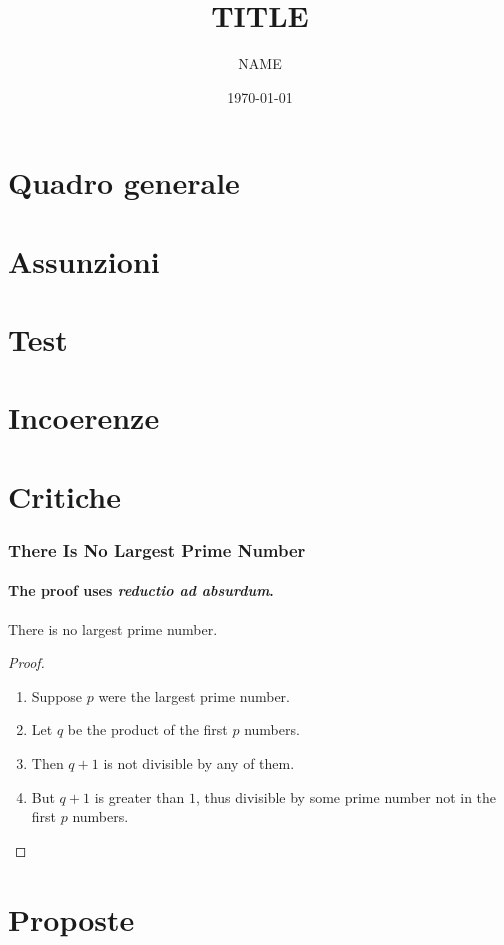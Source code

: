 \documentclass[13pt]{beamer}
\begin{document}
\title[foo]{TITLE}
\author[bar]{NAME}
\date{\today}
\begin{frame}
\maketitle
\end{frame}
\section{Quadro generale}
\section{Assunzioni}
\section{Test}
\section{Incoerenze}
\section{Critiche}
\begin{frame}
\frametitle{There Is No Largest Prime Number}
\framesubtitle{The proof uses \textit{reductio ad absurdum}.}
\begin{theorem}
There is no largest prime number.
\end{theorem}
\begin{proof}
\begin{enumerate}
\item<1-| alert@1> Suppose $p$ were the largest prime number.
\item<2-> Let $q$ be the product of the first $p$ numbers.
\item<3-> Then $q+1$ is not divisible by any of them.
\item<1-> But $q + 1$ is greater than $1$, thus divisible by some prime
number not in the first $p$ numbers.\qedhere
\end{enumerate}
\end{proof}
\end{frame}
\section{Proposte}
\end{document}
